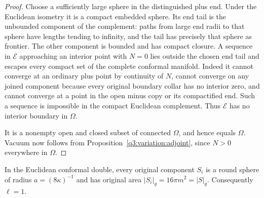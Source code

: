 \begin{proof}
Choose a sufficiently large sphere in the distinguished plus end.
Under the Euclidean isometry it is a compact embedded sphere. Its
end tail is the unbounded component of the complement: paths from
large end radii to that sphere have lengths tending to infinity,
and the tail has precisely that sphere as frontier. The other
component is bounded and has compact closure. A sequence in
$\mathcal E$ approaching an interior point with $N=0$ lies outside
the chosen end tail and escapes every compact set of the complete
conformal manifold. Indeed it cannot converge at an ordinary plus
point by continuity of $N$, cannot converge on any joined component
because every original boundary collar has no interior zero, and
cannot converge at a point in the open minus copy or its compactified
end. Such a sequence is impossible in the compact Euclidean
complement. Thus $\mathcal E$ has no interior boundary in $\Omega$.

It is a nonempty open and closed subset of connected $\Omega$, and
hence equals $\Omega$. Vacuum now follows from
Proposition~\ref{q3:variation:adjoint}, since $N>0$ everywhere in
$\Omega$.
\end{proof}

\begin{lemma}
\label{q3:static:one-boundary-component}
In the Euclidean conformal double, every original component $S_i$
is a round sphere of radius $a=(8\kappa)^{-1}$ and has original area
$|S_i|_g=16\pi m^2=|S|_g$. Consequently $\ell=1$.
\end{lemma}

